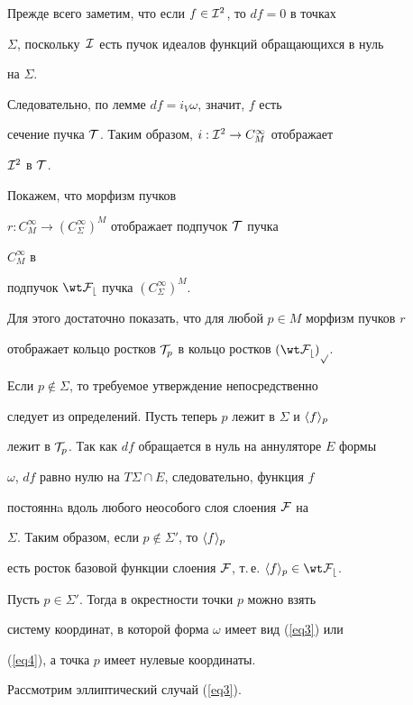 \begin{pf}


Прежде всего заметим, что если $f \in {\cal I}^2$, то $df = 0$ в точках


$\Sigma$, поскольку~${\cal I}$ есть пучок идеалов функций обращающихся в нуль


на $\Sigma$.


Следовательно, по лемме $df = i_V\omega$, значит, $f$ есть


сечение пучка ${\cal T}$. Таким образом, $i : {\cal I}^2 \to C^\infty_M$ отображает


${\cal I}^2$ в ${\cal T}$.





Покажем, что морфизм пучков


$r : C^\infty_M \to (C^\infty_\Sigma)^M$ отображает подпучок ${\cal T}$ пучка


$C^\infty_M$ в


подпучок $\wt\cF_b$ пучка $(C^\infty_\Sigma)^M$.


Для этого достаточно показать, что для любой $p \in M$ морфизм пучков $r$


отображает кольцо ростков ${\cal T}_p$ в кольцо ростков $(\wt\cF_b)_p$.





Если $p \notin \Sigma$, то требуемое утверждение непосредственно


следует из определений. Пусть теперь $p$ лежит в $\Sigma$ и $\langle f \rangle_{p}$


лежит в ${\cal T}_p$. Так как $df$ обращается в нуль на аннуляторе $E$ формы


$\omega$, $df$ равно нулю на $T\Sigma \cap E$, следовательно, функция $f$


постояннa вдоль любого неособого слоя слоения $\cal F$ на


$\Sigma$. Таким образом, если $p \not\in \Sigma'$, то $\langle f \rangle_{p}$


есть росток базовой функции слоения $\cF$, т.\,е. $\germ{f}{p} \in


\wt\cF_b$.





Пусть $p \in \Sigma'$. Тогда в окрестности точки $p$ можно взять


систему координат, в которой форма $\omega$ имеет вид (\ref{eq3}) или


(\ref{eq4}), а точка $p$ имеет нулевые координаты.


Рассмотрим эллиптический случай (\ref{eq3}).



\end{pf}
